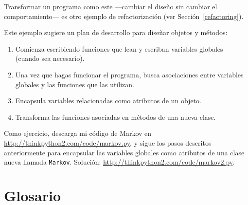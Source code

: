 \documentclass[10pt]{book}
\begin{document}
Transformar un programa como este ---cambiar el diseño sin
cambiar el comportamiento--- es otro ejemplo de refactorización
(ver Sección~\ref{refactoring}).

Este ejemplo sugiere un plan de desarrollo para diseñar objetos y
métodos:

\begin{enumerate}

\item Comienza escribiendo funciones que lean y escriban variables
globales (cuando sea necesario).

\item Una vez que hagas funcionar el programa, busca asociaciones
entre variables globales y las funciones que las utilizan.

\item Encapsula variables relacionadas como atributos de un objeto.

\item Transforma las funciones asociadas en métodos de una nueva
clase.

\end{enumerate}

Como ejercicio, descarga mi código de Markov en
\url{http://thinkpython2.com/code/markov.py}, y sigue los pasos
descritos anteriormente para encapsular las variables globales como atributos de una clase
nueva llamada {\tt Markov}.  Solución:
\url{http://thinkpython2.com/code/markov2.py}.


\section{Glosario}
\end{document}
